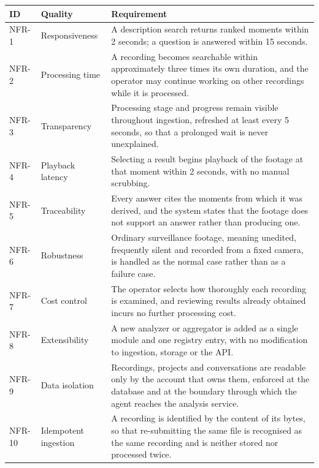 \begin{table}[htbp]
\centering
\small
\begin{tabularx}{\textwidth}{@{}lL{2.8cm}X@{}}
\toprule
\textbf{ID} & \textbf{Quality} & \textbf{Requirement} \\
\midrule
NFR-1 & Responsiveness & A description search returns ranked moments within 2 seconds; a question is answered within 15 seconds. \\
NFR-2 & Processing time & A recording becomes searchable within approximately three times its own duration, and the operator may continue working on other recordings while it is processed. \\
NFR-3 & Transparency & Processing stage and progress remain visible throughout ingestion, refreshed at least every 5 seconds, so that a prolonged wait is never unexplained. \\
NFR-4 & Playback latency & Selecting a result begins playback of the footage at that moment within 2 seconds, with no manual scrubbing. \\
NFR-5 & Traceability & Every answer cites the moments from which it was derived, and the system states that the footage does not support an answer rather than producing one. \\
NFR-6 & Robustness & Ordinary surveillance footage, meaning unedited, frequently silent and recorded from a fixed camera, is handled as the normal case rather than as a failure case. \\
NFR-7 & Cost control & The operator selects how thoroughly each recording is examined, and reviewing results already obtained incurs no further processing cost. \\
NFR-8 & Extensibility & A new analyzer or aggregator is added as a single module and one registry entry, with no modification to ingestion, storage or the API. \\
NFR-9 & Data isolation & Recordings, projects and conversations are readable only by the account that owns them, enforced at the database and at the boundary through which the agent reaches the analysis service. \\
NFR-10 & Idempotent ingestion & A recording is identified by the content of its bytes, so that re-submitting the same file is recognised as the same recording and is neither stored nor processed twice. \\
\bottomrule
\end{tabularx}
\end{table}
